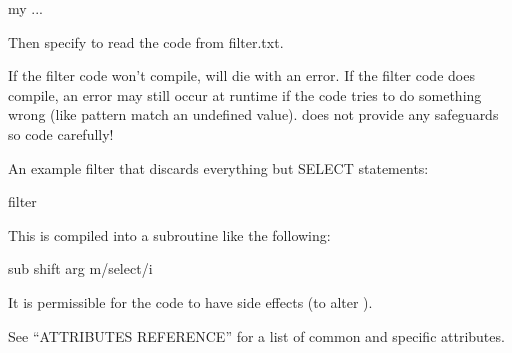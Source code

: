 \documentclass[letterpaper,10pt,english]{sphinxmanual}
\begin{document}
\begin{fulllineitems}
\begin{sphinxVerbatim}[commandchars=\\\{\}]
my   ...        
\end{sphinxVerbatim}

Then specify  to read the code from filter.txt.

If the filter code won’t compile,  will die with an error.
If the filter code does compile, an error may still occur at runtime if the
code tries to do something wrong (like pattern match an undefined value).
 does not provide any safeguards so code carefully!

An example filter that discards everything but SELECT statements:

\begin{sphinxVerbatim}[commandchars=\\\{\}]
\PYGZhy{}\PYGZhy{}filter 
\end{sphinxVerbatim}

This is compiled into a subroutine like the following:

\begin{sphinxVerbatim}[commandchars=\\\{\}]
sub    shift  \PYGZhy{}\PYGZgt{}arg \PYGZti{} m/\PYGZca{}select/i     
\end{sphinxVerbatim}

It is permissible for the code to have side effects (to alter ).

See “ATTRIBUTES REFERENCE” for a list of common and {\hyperref[\detokenize{mariadb-query-digest:cmdoption-mariadb-query-digest-type}]{}} specific
attributes.


\end{fulllineitems}
\end{document}
